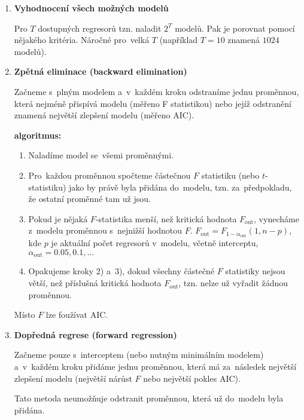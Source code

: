 \begin{enumerate}[1)]

\item
\textbf{Vyhodnocení všech možných modelů}

Pro $T$ dostupných regresorů tzn. naladit $2^T$ modelů. Pak je porovnat pomocí nějakého kritéria. Náročné pro~velká $T$ (například $T = 10$ znamená $1024$ modelů).

\item
\textbf{Zpětná eliminace (backward elimination)}

Začneme s~plným modelem a~v~každém kroku odstraníme jednu proměnnou, která nejméně přispívá modelu (měřeno F statistikou) nebo jejíž odstranění znamená největší zlepšení modelu (měřeno AIC).

\textbf{algoritmus:}
\begin{enumerate}[	1)]
	\item Naladíme model se~všemi proměnnými.
	\item Pro~každou proměnnou spočteme částečnou $F$ statistiku (nebo $t$-statistiku) jako by právě byla přidána do~modelu, tzn. za~předpokladu, že ostatní proměnné tam už jsou.
	\item Pokud je nějaká $F$-statistika menší, než kritická hodnota $F_\mathrm{out}$, vynecháme z~modelu proměnnou s~nejnižší hodnotou $F$. $F_\mathrm{out} = F_{1-\alpha_{\mathrm{out}}}(1,n-p)$, kde $p$ je aktuální počet regresorů v~modelu, včetně interceptu, $\alpha_\text{out} = 0.05,0.1,...$
	\item Opakujeme kroky 2) a~3), dokud všechny částečné $F$ statistiky nejsou větší, než příslušná kritická hodnota $F_\mathrm{out}$, tzn. nelze už vyřadit žádnou proměnnou.
\end{enumerate}
\begin{remark}
	Místo $F$ lze foužívat AIC.
\end{remark}

\item
\textbf{Dopředná regrese (forward regression)}

Začneme pouze s~interceptem (nebo nutným minimálním modelem) a~v~každém kroku přidáme jednu proměnnou, která má za~následek největší zlepšení modelu (největší nárůst $F$ nebo největší pokles AIC).

Tato metoda neumožňuje odstranit proměnnou, která už do~modelu byla přidána.


\end{enumerate}
